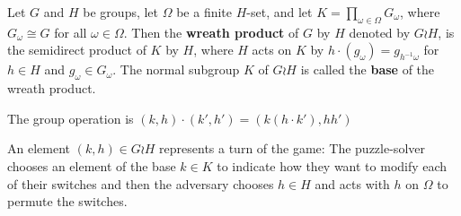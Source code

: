 \begin{definition}
  Let $G$ and $H$ be groups,
  let $\Omega$ be a finite $H$-set, and
  let $K = \prod_{\omega \in \Omega} G_\omega$, where $G_\omega \cong G$
  for all $\omega \in \Omega$.
  Then the \textbf{wreath product} of $G$ by $H$ denoted by $G \wr H$,
  is the semidirect product of $K$ by $H$,
  where $H$ acts on $K$ by $h \cdot (g_\omega) = g_{h^{-1}\omega}$ for $h \in H$
  and $g_\omega \in G_\omega$.
  The normal subgroup $K$ of $G \wr H$ is called
  the \textbf{base} of the wreath product.

  The group operation is $(k, h) \cdot (k', h') = (k(h \cdot k'), hh')$
\end{definition}

An element $(k, h) \in G \wr H$ represents a turn of the game:
The puzzle-solver chooses an element of the base $k \in K$ to indicate
how they want to modify each of their switches
and then the adversary chooses $h \in H$ and acts with $h$ on $\Omega$ to
permute the switches.


